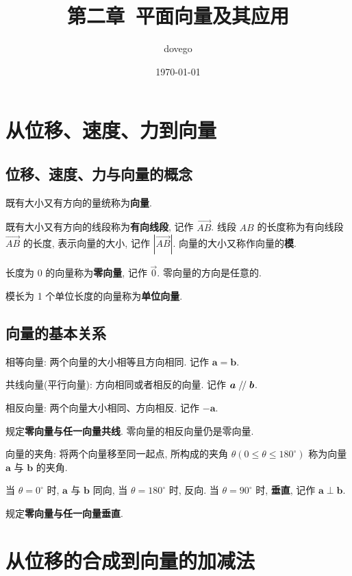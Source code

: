 \documentclass[titlepage]{ctexart}
\title{第二章~平面向量及其应用}
\author{dovego}
\date{\today}
\renewcommand\parallel{\mathrel{/\mskip-2.5mu/}}
\begin{document}
\maketitle

\section{从位移、速度、力到向量}

\subsection{位移、速度、力与向量的概念}
既有大小又有方向的量统称为\textbf{向量}.

既有大小又有方向的线段称为\textbf{有向线段}, 记作 $\overrightarrow{AB}$.
线段 $AB$ 的长度称为有向线段 $\overrightarrow{AB}$ 的长度, 表示向量的大小, 记作 $|\overrightarrow{AB}|$.
向量的大小又称作向量的\textbf{模}.

长度为 0 的向量称为\textbf{零向量}, 记作 $\vec{0}$. 零向量的方向是任意的.

模长为 1 个单位长度的向量称为\textbf{单位向量}.

\subsection{向量的基本关系}

相等向量: 两个向量的大小相等且方向相同. 记作 $\boldsymbol{a} = \boldsymbol{b}$.

共线向量(平行向量): 方向相同或者相反的向量. 记作 $\boldsymbol{a} \parallel \boldsymbol{b}$. 

相反向量: 两个向量大小相同、方向相反. 记作 $-\boldsymbol{a}$.

规定\textbf{零向量与任一向量共线}. 零向量的相反向量仍是零向量.

向量的夹角: 将两个向量移至同一起点, 所构成的夹角 $\theta(0 \leqslant \theta \leqslant 180^\circ)$ 称为向量 $\boldsymbol{a}$ 与 $\boldsymbol{b}$ 的夹角.

当 $\theta = 0^\circ$ 时, $\boldsymbol{a}$ 与 $\boldsymbol{b}$ 同向, 当 $\theta = 180^\circ$ 时, 反向.
当 $\theta = 90^\circ$ 时, \textbf{垂直}, 记作 $\boldsymbol{a} \perp \boldsymbol{b}$.

规定\textbf{零向量与任一向量垂直}. 


\section{从位移的合成到向量的加减法}
\end{document}
